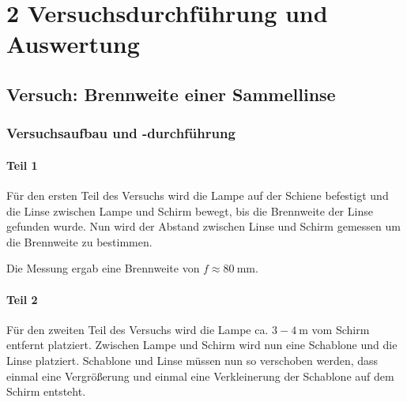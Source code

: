 \chapter*{2 Versuchsdurchführung und Auswertung}
\setcounter{chapter}{2}
\setcounter{section}{0}
\setcounter{subsection}{0}

\section{Versuch: Brennweite einer Sammellinse}

\subsection{Versuchsaufbau und -durchführung}


    \subsubsection{Teil 1}
    
        Für den ersten Teil des Versuchs wird die Lampe auf der Schiene befestigt und die Linse zwischen Lampe und Schirm bewegt, bis die Brennweite der Linse gefunden wurde. Nun wird der Abstand zwischen Linse und Schirm gemessen um die Brennweite zu bestimmen.

        Die Messung ergab eine Brennweite von $f \approx 80\ \mathrm{mm}$.

    \subsubsection{Teil 2}
    
        Für den zweiten Teil des Versuchs wird die Lampe ca. $3 - 4\ \mathrm{m}$ vom Schirm entfernt platziert. Zwischen Lampe und Schirm wird nun eine Schablone und die Linse platziert. Schablone und Linse müssen nun so verschoben werden, dass einmal eine Vergrößerung und einmal eine Verkleinerung der Schablone auf dem Schirm entsteht.


